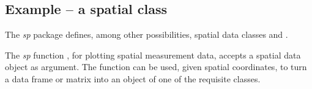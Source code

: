 \subsection*{Example -- a spatial class}\label{ss:bubble}

The {\em sp} package defines, among other possibilities, spatial data
classes  and .

The {\em sp} function , for plotting spatial measurement data,
accepts a spatial data object as argument.
The function  can be used, given spatial coordinates,
to turn a data frame or matrix into an object of one of the requisite
classes.

